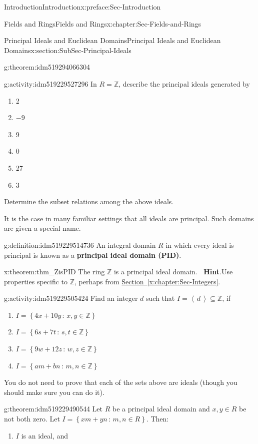 \documentclass[oneside,10pt,]{book}
\newcommand{\blocktitlefont}{\relax}
\newcommand{\xreffont}{\relax}
\newcommand{\terminology}[1]{\textbf{#1}}
\numberwithin{equation}{section}
\newcommand{\ideal}[1]{\left\langle\, #1 \,\right\rangle}
\newcommand{\setof}[2]{{\left\{#1\,\colon\,#2\right\}}}
\def\Z{{\mathbb Z}}
\begin{document}
\begin{preface}{Introduction}{}{Introduction}{}{}{x:preface:Sec-Introduction}
\begin{chapterptx}{Fields and Rings}{}{Fields and Rings}{}{}{x:chapter:Sec-Fields-and-Rings}
\begin{sectionptx}{Principal Ideals and Euclidean Domains}{}{Principal Ideals and Euclidean Domains}{}{}{x:section:SubSec-Principal-Ideals}
\begin{theorem}{}{}{g:theorem:idm519294066304}
\end{theorem}
\begin{activity}{}{g:activity:idm519229527296}%
In \(R = \Z\), describe the principal ideals generated by%
\begin{enumerate}
\item{}2%
\item{}\(-9\)%
\item{}9%
\item{}0%
\item{}27%
\item{}3%
\end{enumerate}
%
\par
Determine the subset relations among the above ideals.%
\end{activity}
It is the case in many familiar settings that all ideals are principal. Such domains are given a special name.%
\begin{definition}{}{g:definition:idm519229514736}%
An integral domain \(R\) in which every ideal is principal is known as a \terminology{principal ideal domain (PID)}.%
\end{definition}
\begin{theorem}{}{}{x:theorem:thm_ZisPID}%
The ring \(\Z\) is a principal ideal domain.%
\textbf{\blocktitlefont\ Hint}.\quad{}Use properties specific to \(\Z\), perhaps from \hyperref[x:chapter:Sec-Integers]{Section~{\xreffont\ref{x:chapter:Sec-Integers}}}.%
\end{theorem}
\begin{activity}{}{g:activity:idm519229505424}%
Find an integer \(d\) such that \(I = \ideal{d}\subseteq \Z\), if%
\begin{enumerate}
\item{}\(I = \setof{4x+10y}{x,y\in\Z}\)%
\item{}\(I = \setof{6s+7t}{s,t\in\Z}\)%
\item{}\(I = \setof{9w+12z}{w,z\in\Z}\)%
\item{}\(I = \setof{am+bn}{m,n\in\Z}\)%
\end{enumerate}
%
\par
You do not need to prove that each of the sets above are ideals (though you should make sure you can do it).%
\end{activity}
\begin{theorem}{}{}{g:theorem:idm519229490544}%
Let \(R\) be a principal ideal domain and \(x,y\in R\) be not both zero. Let \(I = \setof{xm+yn}{m,n\in R}\). Then:%
\begin{enumerate}
\item{}\(I\) is an ideal, and%

\end{enumerate}
\end{theorem}
\end{sectionptx}
\end{chapterptx}
\end{preface}
\end{document}
